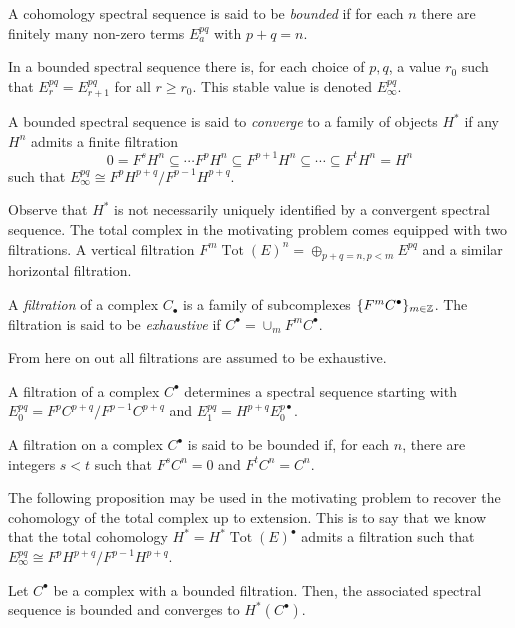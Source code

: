 \begin{definition}
  A cohomology spectral sequence is said to be {\it bounded} if for each $n$ there are finitely many non-zero terms $E^{pq}_a$ with $p+q = n$.
\end{definition}
In a bounded spectral sequence there is, for each choice of $p,q$, a value $r_0$ such that $E_{r}^{pq}= E_{r+1}^{pq}$ for all $r \geq r_0$. This stable value is denoted $E^{pq}_\infty$.
\begin{definition}
  A bounded spectral sequence is said to {\it converge} to a family of objects $H^*$ if any $H^n$ admits a finite filtration
  $$0 = F^s H^n \subseteq \cdots F^p H^n \subseteq F^{p+1}H^n \subseteq \cdots \subseteq F^t H^n = H^n $$
  such that $E^{pq}_\infty \cong F^p H^{p+q} / F^{p-1} H^{p+q}$.
\end{definition}
Observe that $H^*$ is not necessarily uniquely identified by a convergent spectral sequence.
The total complex in the motivating problem comes equipped with two filtrations.
A vertical filtration $F^{m} \operatorname{Tot}(E)^n = \oplus_{p+q = n, p <m} E^{pq}$ and a similar horizontal filtration.
\begin{definition}
  A {\it filtration} of a complex $C_\bullet$ is a family of subcomplexes $\{F^m C^\bullet\}_{m\in \mathbb{Z}}$.
  The filtration is said to be {\it exhaustive} if $C^\bullet = \cup_m F^mC^\bullet$.
\end{definition}
From here on out all filtrations are assumed to be exhaustive.
\begin{proposition}{\cite[Theorem 5.4.1.]{weibel1995introduction}}
 A filtration of a complex $C^\bullet$ determines a spectral sequence starting with $E^{pq}_0 = F^p C^{p+q}/F^{p-1}C^{p+q}$ and $E^{pq}_1= H^{p+q} E^{p\bullet}_0$.
\end{proposition}
\begin{definition}
 A filtration on a complex $C^\bullet$ is said to be bounded
 if, for each $n$, there are integers $s<t$ such that $F^s C^n = 0$ and $F^t C^n = C^n$.
\end{definition}
The following proposition may be used in the motivating problem to recover the cohomology of the total complex up to extension.
This is to say that we know that the total cohomology $H^* = H^* \operatorname{Tot}(E)^\bullet$ admits a filtration such that $E^{pq}_\infty \cong F^p H^{p+q}/ F^{p-1} H^{p+q}$.
 \begin{proposition}{\cite[Theorem 5.51.]{weibel1995introduction}}\label{prop: FiltrationSpectral}
   Let $C^\bullet$ be a complex with a bounded filtration.
   Then, the associated spectral sequence is bounded and converges to $H^*(C^\bullet)$.
 \end{proposition}
